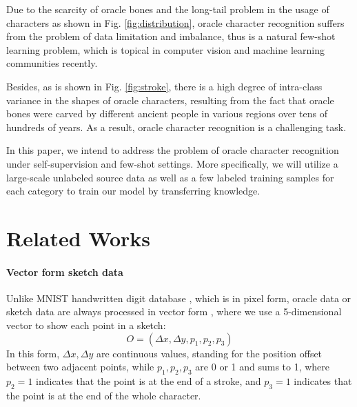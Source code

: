 \documentclass{article}
\begin{document}
Due to the scarcity of oracle bones and the long-tail problem in the usage of characters as shown in Fig. \ref{fig:distribution}, oracle character recognition suffers from the problem of data limitation and imbalance, thus is a natural few-shot learning problem, which is topical in computer vision and machine learning communities recently. 

Besides, as is shown in Fig. \ref{fig:stroke}, there is a high degree of intra-class variance in the shapes of oracle characters, resulting from the fact that oracle bones were carved by different ancient people in various regions over tens of hundreds of years. As a result, oracle character recognition is a challenging task.

In this paper, we intend to address the problem of oracle character recognition under self-supervision and few-shot settings. More specifically, we will utilize a large-scale unlabeled source data as well as a few labeled training samples for each category to train our model by transferring knowledge.

\section{Related Works}

\paragraph{Vector form sketch data}
Unlike MNIST handwritten digit database \citep{MNIST}, which is in pixel form, oracle data or sketch data are always processed  in vector form \citep{Sketch-BERT}, where we use a 5-dimensional vector to show each point in a sketch:
\begin{equation}
	O = (\Delta x, \Delta y, p_1, p_2, p_3)
	\label{equ:vec}
\end{equation}
In this form, $ \Delta x, \Delta y $ are continuous values, standing for the position offset between two adjacent points,
while $ p_1, p_2, p_3 $ are 0 or 1 and sums to 1, 
where $ p_2 = 1 $ indicates that the point is at the end of a stroke, and $ p_3 = 1 $ indicates that the point is at the end of the whole character.
\end{document}
